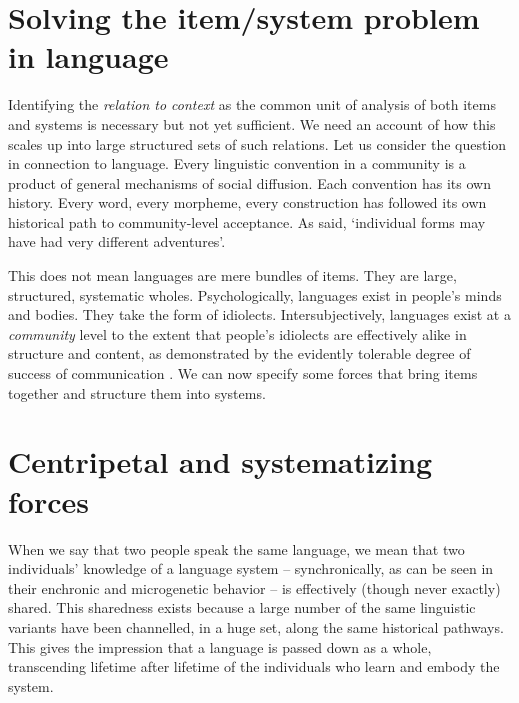 \section{Solving the item/system problem in language}


Identifying the \textit{relation to context} as the common unit of 
analysis of both items and systems is necessary but not yet sufficient. We 
need an account of how this scales up into large structured sets of such 
relations. Let us consider the question in connection to language. Every linguistic convention in a community is a 
product of general mechanisms of social diffusion. Each convention has its own history. Every word, 
every morpheme, every construction has followed its own historical path to 
community-level acceptance. As \citet[444]{bloomfield_language_1933} said, \textquoteleft individual forms may have had very 
different adventures'. 



This does not mean languages are mere bundles 
of items. They are large, structured, systematic wholes. Psychologically, languages exist in people's minds and bodies.
They take the form of idiolects. Intersubjectively, 
languages exist at a \textit{community} level to the extent that people's 
idiolects are effectively alike in structure and content, as 
demonstrated by the evidently tolerable degree of success 
of communication \citep{enfield_utility_2015}. 
\enlargethispage{1em}
We can now 
specify some forces that bring items together and structure them into 
systems.



\section{Centripetal and systematizing forces}

When we say that two people speak the same language, we mean that two individuals' knowledge of a language system -- synchronically, as can be seen in their enchronic and microgenetic behavior -- is effectively (though never exactly) shared. This sharedness exists because a large number of the same linguistic variants have been channelled, in a huge set, along the same historical pathways. This gives the impression that a language is passed down as a whole, transcending lifetime after lifetime of the individuals who learn and embody the system. 



